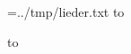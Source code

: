 \documentclass{liederbuch}
\begin{document}
    
    \tableofcontents
    \clearpage

    \newread\songs
    \openin\songs=../tmp/lieder.txt
    \read\songs to \currentSong
    \loop\unless\ifeof\songs
    
    \read\songs to \currentSong
    \repeat
    \closein\songs
\end{document}

